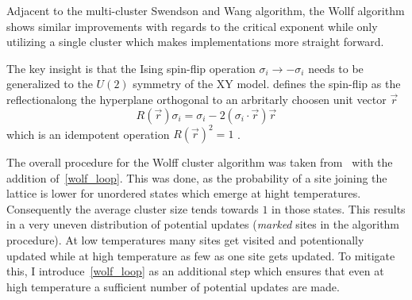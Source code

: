 		Adjacent to the multi-cluster Swendson and Wang algorithm, the Wollf algorithm shows similar improvements with regards to the critical exponent while only utilizing a single cluster which makes implementations more straight forward.
		
		The key insight is that the Ising spin-flip operation $\sigma_i \rightarrow -\sigma_i$ needs to be generalized to the $U(2)$ symmetry of the XY model. \cite{wolff} defines the spin-flip as the reflectionalong the hyperplane orthogonal to an arbritarly choosen unit vector $\vec{r}$
		\begin{equation}
			R(\vec{r}) \sigma_i = \sigma_i - 2 (\sigma_i \cdot \vec{r}) \vec{r} 
		\end{equation}
		which is an idempotent operation $R(\vec{r})^2=1$ \cite[eq. 3]{wolff}.
	
		The overall procedure for the Wolff cluster algorithm was taken from~\cite[p. 361]{wolff} with the addition of~\cref{wolf_loop}. This was done, as the probability of a site joining the lattice is lower for unordered states which emerge at hight temperatures. Consequently the average cluster size tends towards $1$ in those states. This results in a very uneven distribution of potential updates (\emph{marked} sites in the algorithm procedure). At low temperatures many sites get visited and potentionally updated while at high temperature as few as one site gets updated. To mitigate this, I introduce~\cref{wolf_loop} as an additional step which ensures that even at high temperature a sufficient number of potential updates are made.
